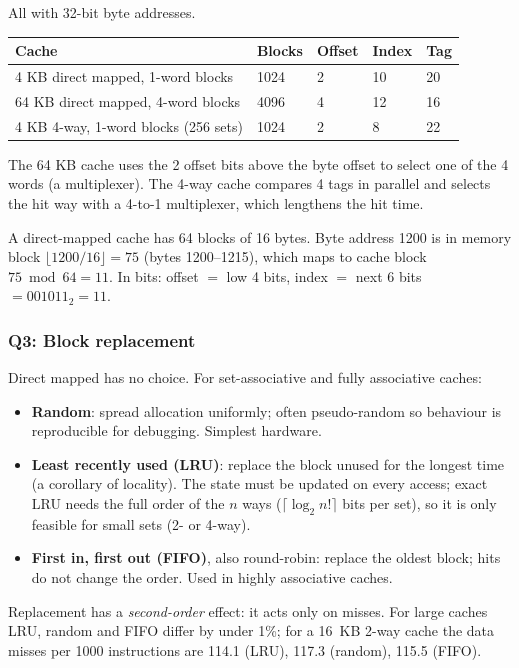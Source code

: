 \begin{eg}
All with 32-bit byte addresses.
\begin{center}
\small
\begin{tabular}{@{}lllll@{}}
\toprule
Cache & Blocks & Offset & Index & Tag \\
\midrule
4 KB direct mapped, 1-word blocks & 1024 & 2 & 10 & 20 \\
64 KB direct mapped, 4-word blocks & 4096 & 4 & 12 & 16 \\
4 KB 4-way, 1-word blocks (256 sets) & 1024 & 2 & 8 & 22 \\
\bottomrule
\end{tabular}
\end{center}
The 64 KB cache uses the 2 offset bits above the byte offset to select one of the
4 words (a multiplexer). The 4-way cache compares 4 tags in parallel and selects
the hit way with a 4-to-1 multiplexer, which lengthens the hit time.
\end{eg}

\begin{eg}
A direct-mapped cache has 64 blocks of 16 bytes. Byte address 1200 is in memory
block $\lfloor1200/16\rfloor=75$ (bytes 1200--1215), which maps to cache block
$75\bmod64=11$. In bits: offset $=$ low 4 bits, index $=$ next 6 bits $=001011_2=11$.
\end{eg}

\subsubsection{Q3: Block replacement}
Direct mapped has no choice. For set-associative and fully associative caches:
\begin{itemize}
  \item \textbf{Random}: spread allocation uniformly; often pseudo-random so
  behaviour is reproducible for debugging. Simplest hardware.
  \item \textbf{Least recently used (LRU)}: replace the block unused for the
  longest time (a corollary of locality). The state must be updated on every
  access; exact LRU needs the full order of the $n$ ways ($\lceil\log_2 n!\rceil$
  bits per set), so it is only feasible for small sets (2- or 4-way).
  \item \textbf{First in, first out (FIFO)}, also round-robin: replace the oldest
  block; hits do not change the order. Used in highly associative caches.
\end{itemize}
Replacement has a \emph{second-order} effect: it acts only on misses. For large
caches LRU, random and FIFO differ by under 1\%; for a 16~KB 2-way cache the
data misses per 1000 instructions are 114.1 (LRU), 117.3 (random), 115.5
(FIFO).

